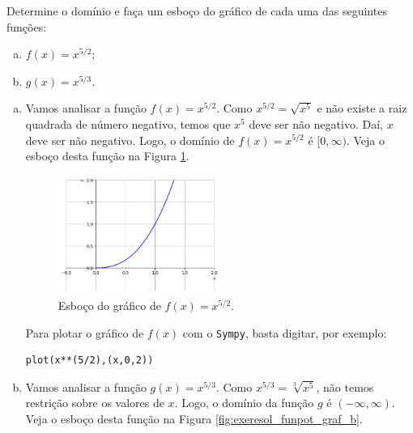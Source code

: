 \begin{exeresol}\label{exeresol:funpot_graf}
  Determine o domínio e faça um esboço do gráfico de cada uma das seguintes funções:
  \begin{enumerate}[a)]
  \item $\displaystyle f(x) = x^{5/2}$;
  \item $\displaystyle g(x) = x^{5/3}$.
  \end{enumerate}
\end{exeresol}
\begin{resol}
  \begin{enumerate}[a)]
  \item Vamos analisar a função $f(x) = x^{5/2}$. Como $x^{5/2} = \sqrt{x^5}$ e não existe a raiz quadrada de número negativo, temos que $x^5$ deve ser não negativo. Daí, $x$ deve ser não negativo. Logo, o domínio de $f(x) = x^{5/2}$ é $[0, \infty)$. Veja o esboço desta função na Figura \ref{fig:exeresol_funpot_graf_a}.

    \begin{figure}[H]
      \centering
      \includegraphics[width=0.5\textwidth]{./cap_funcao/dados/fig_exeresol_funpot_graf/fig_exeresol_funpot_graf_a}
      \caption{Esboço do gráfico de $f(x) = x^{5/2}$.}
      \label{fig:exeresol_funpot_graf_a}
    \end{figure}

    \ifispython
    Para plotar o gráfico de $f(x)$ com o \verb+Sympy+, basta digitar, por exemplo:
\begin{verbatim}
plot(x**(5/2),(x,0,2))
\end{verbatim}
    \fi
  \item Vamos analisar a função $g(x) = x^{5/3}$. Como $x^{5/3} = \sqrt[3]{x^5}$, não temos restrição sobre os valores de $x$. Logo, o domínio da função $g$ é $(-\infty, \infty)$. Veja o esboço desta função na Figura \ref{fig:exeresol_funpot_graf_b}.


\end{enumerate}
\end{resol}
